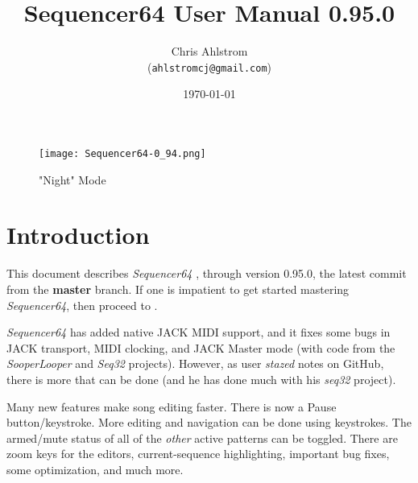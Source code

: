 \documentclass[
 11pt,
 twoside,
 a4paper,
 headinclude,
 footinclude,
 final                                 %
]{article}
\begin{document}
\title{Sequencer64 User Manual 0.95.0}
\author{Chris Ahlstrom \\
   (\texttt{ahlstromcj@gmail.com})}
\date{\today}
\maketitle

\begin{figure}[H]
   \centering 
   \texttt{[image: Sequencer64-0\_94.png]}
   \caption*{"Night" Mode}
\end{figure}

\clearpage                             %

\tableofcontents
\listoffigures                         %
\listoftables                          %


\setlength{\parindent}{2em}
\setlength{\parskip}{1ex plus 0.5ex minus 0.2ex}

\section{Introduction}
\label{sec:introduction}

   This document describes \textsl{Sequencer64}
   \cite{sequencer64}, through version 0.95.0,
   the latest commit from the \textbf{master} branch.
   If one is impatient to get started mastering \textsl{Sequencer64},
   then proceed to .

   \textsl{Sequencer64} has added native JACK MIDI support,
   and it fixes some bugs in JACK transport, MIDI clocking, and
   JACK Master mode (with code from the \textsl{SooperLooper} 
   and \textsl{Seq32} projects).
   However, as user \textsl{stazed} notes on GitHub, there is more that can be
   done (and he has done much with his \textsl{seq32} \cite{seq32} project).

   Many new features make song editing faster.
   There is now a Pause button/keystroke.
   More editing and navigation can be done using keystrokes.
   The armed/mute status of all of the \textsl{other} active patterns can be
   toggled.
   There are zoom keys for the editors, current-sequence highlighting,
   important bug fixes, some optimization, and much more.
\end{document}
